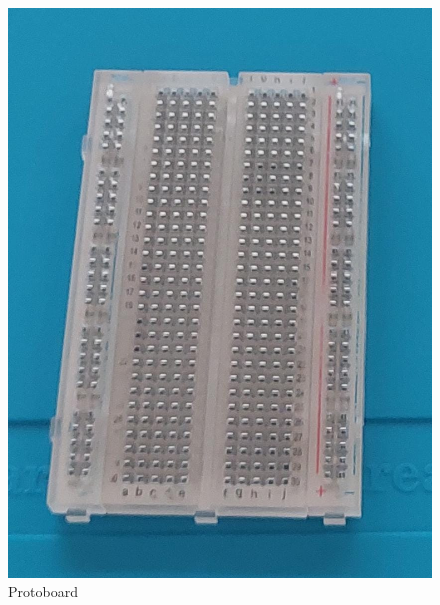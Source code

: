     \begin{figure}[H]
        \centering
        \includegraphics[trim = {10mm 100mm 0mm 0mm},clip,scale=0.2]{10/Img/protoboard.jpg}
        \caption{Protoboard}
        \label{Protoboard}
    \end{figure}
    
